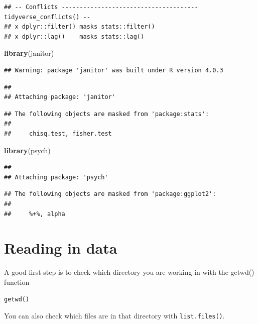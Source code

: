 \documentclass[
]{book}
\newenvironment{Shaded}{\begin{snugshade}}{\end{snugshade}}
\newcommand{\KeywordTok}[1]{\textcolor[rgb]{0.13,0.29,0.53}{\textbf{#1}}}
\newcommand{\NormalTok}[1]{#1}
\begin{document}
\begin{verbatim}
## -- Conflicts -------------------------------------- tidyverse_conflicts() --
## x dplyr::filter() masks stats::filter()
## x dplyr::lag()    masks stats::lag()
\end{verbatim}

\begin{Shaded}
\begin{Highlighting}[]
\KeywordTok{library}\NormalTok{(janitor)}
\end{Highlighting}
\end{Shaded}

\begin{verbatim}
## Warning: package 'janitor' was built under R version 4.0.3
\end{verbatim}

\begin{verbatim}
## 
## Attaching package: 'janitor'
\end{verbatim}

\begin{verbatim}
## The following objects are masked from 'package:stats':
## 
##     chisq.test, fisher.test
\end{verbatim}

\begin{Shaded}
\begin{Highlighting}[]
\KeywordTok{library}\NormalTok{(psych)}
\end{Highlighting}
\end{Shaded}

\begin{verbatim}
## 
## Attaching package: 'psych'
\end{verbatim}

\begin{verbatim}
## The following objects are masked from 'package:ggplot2':
## 
##     %+%, alpha
\end{verbatim}

\hypertarget{reading-in-data}{%
\section{Reading in data}\label{reading-in-data}}

A good first step is to check which directory you are working in with the getwd() function

\texttt{getwd()}

You can also check which files are in that directory with \texttt{list.files()}.
\end{document}
